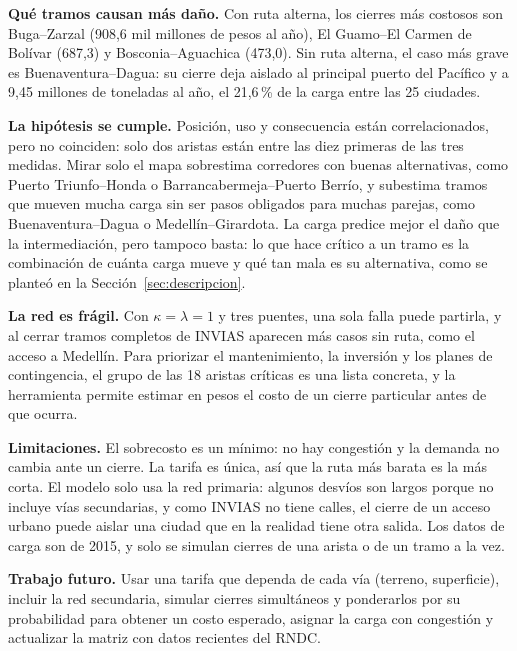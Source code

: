 \documentclass[conference]{IEEEtran}
\begin{document}
\textbf{Qué tramos causan más daño.} Con ruta alterna, los cierres más costosos
son Buga--Zarzal (908,6 mil millones de pesos al año), El Guamo--El Carmen de
Bolívar (687,3) y Bosconia--Aguachica (473,0). Sin ruta alterna, el caso más
grave es Buenaventura--Dagua: su cierre deja aislado al principal puerto del
Pacífico y a 9,45 millones de toneladas al año, el 21,6\,\% de la carga entre
las 25 ciudades.

\textbf{La hipótesis se cumple.} Posición, uso y consecuencia están
correlacionados, pero no coinciden: solo dos aristas están entre las diez
primeras de las tres medidas. Mirar solo el mapa sobrestima corredores con
buenas alternativas, como Puerto Triunfo--Honda o Barrancabermeja--Puerto
Berrío, y subestima tramos que mueven mucha carga sin ser pasos obligados para
muchas parejas, como Buenaventura--Dagua o Medellín--Girardota. La carga
predice mejor el daño que la intermediación, pero tampoco basta: lo que hace
crítico a un tramo es la combinación de cuánta carga mueve y qué tan mala es su
alternativa, como se planteó en la Sección~\ref{sec:descripcion}.

\textbf{La red es frágil.} Con $\kappa=\lambda=1$ y tres puentes, una sola falla
puede partirla, y al cerrar tramos completos de INVIAS aparecen más casos sin
ruta, como el acceso a Medellín. Para priorizar el mantenimiento, la inversión
y los planes de contingencia, el grupo de las 18 aristas críticas es una lista
concreta, y la herramienta permite estimar en pesos el costo de un cierre
particular antes de que ocurra.

\textbf{Limitaciones.} El sobrecosto es un mínimo: no hay congestión y la
demanda no cambia ante un cierre. La tarifa es única, así que la ruta más
barata es la más corta. El modelo solo usa la red primaria: algunos desvíos son
largos porque no incluye vías secundarias, y como INVIAS no tiene calles, el
cierre de un acceso urbano puede aislar una ciudad que en la realidad tiene
otra salida. Los datos de carga son de 2015, y solo se simulan cierres de una
arista o de un tramo a la vez.

\textbf{Trabajo futuro.} Usar una tarifa que dependa de cada vía (terreno,
superficie), incluir la red secundaria, simular cierres simultáneos y
ponderarlos por su probabilidad para obtener un costo esperado, asignar la
carga con congestión y actualizar la matriz con datos recientes del RNDC.

\balance


\end{document}
